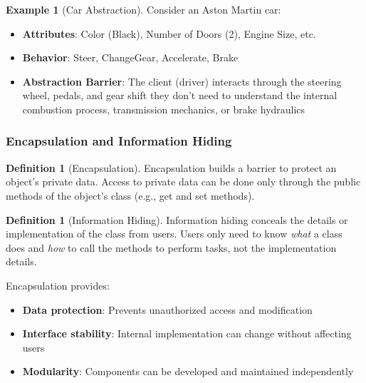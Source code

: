 \documentclass[11pt, a4paper, notitlepage]{report}
\theoremstyle{definition}
\newtheorem{definition}[theorem]{Definition}
\theoremstyle{remark}
\theoremstyle{definition}
\newtheorem{example}[theorem]{Example}
\begin{document}
\begin{example}[Car Abstraction]
\label{ex:ch1-car-abstraction}
Consider an Aston Martin car:
\begin{itemize}
  \item \textbf{Attributes}: Color (Black), Number of Doors (2), Engine Size, etc.
  \item \textbf{Behavior}: Steer, ChangeGear, Accelerate, Brake
  \item \textbf{Abstraction Barrier}: The client (driver) interacts through the steering wheel, pedals, and gear shift  they don't need to understand the internal combustion process, transmission mechanics, or brake hydraulics
\end{itemize}
\end{example}

\subsubsection{Encapsulation and Information Hiding}

\begin{definition}[Encapsulation]
\label{def:ch1-encapsulation}
Encapsulation builds a barrier to protect an object's private data. Access to private data can be done only through the public methods of the object's class (e.g., get and set methods).
\end{definition}

\begin{definition}[Information Hiding]
\label{def:ch1-info-hiding}
Information hiding conceals the details or implementation of the class from users. Users only need to know \emph{what} a class does and \emph{how} to call the methods to perform tasks, not the implementation details.
\end{definition}

\begin{keyresult}[title={Benefits of Encapsulation}]
Encapsulation provides:
\begin{itemize}
  \item \textbf{Data protection}: Prevents unauthorized access and modification
  \item \textbf{Interface stability}: Internal implementation can change without affecting users
  \item \textbf{Modularity}: Components can be developed and maintained independently
\end{itemize}
\end{keyresult}
\end{document}
